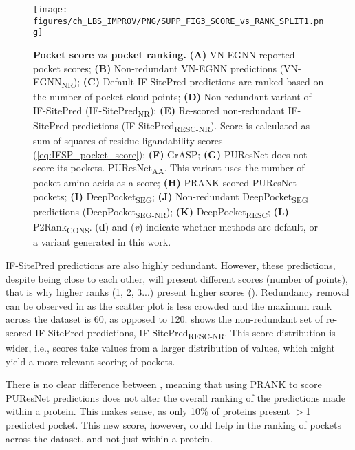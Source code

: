 \begin{figure}[htb!]
    \centering
    \texttt{[image: figures/ch\_LBS\_IMPROV/PNG/SUPP\_FIG3\_SCORE\_vs\_RANK\_SPLIT1.png]}
    \caption[Pocket score \textit{vs} pocket ranking]{\textbf{Pocket score \textit{vs} pocket ranking.} \textbf{(A)} VN-EGNN reported pocket scores; \textbf{(B)} Non-redundant VN-EGNN predictions (VN-EGNN\textsubscript{NR}); \textbf{(C)} Default IF-SitePred predictions are ranked based on the number of pocket cloud points; \textbf{(D)} Non-redundant variant of IF-SitePred (IF-SitePred\textsubscript{NR}); \textbf{(E)} Re-scored non-redundant IF-SitePred predictions (IF-SitePred\textsubscript{RESC-NR}). Score is calculated as sum of squares of residue ligandability scores (\autoref{eq:IFSP_pocket_score}); \textbf{(F)} GrASP; \textbf{(G)} PUResNet does not score its pockets. PUResNet\textsubscript{AA}. This variant uses the number of pocket amino acids as a score; \textbf{(H)} PRANK scored PUResNet pockets; \textbf{(I)} DeepPocket\textsubscript{SEG}; \textbf{(J)} Non-redundant DeepPocket\textsubscript{SEG} predictions (DeepPocket\textsubscript{SEG-NR}); \textbf{(K)} DeepPocket\textsubscript{RESC}; \textbf{(L)} P2Rank\textsubscript{CONS}. (\textbf{d}) and (\textit{v}) indicate whether methods are default, or a variant generated in this work.}
    \label{fig:pocket_score_vs_rank1}
\end{figure}

IF-SitePred predictions are also highly redundant. However, these predictions, despite being close to each other, will present different scores (number of points), that is why higher ranks (1, 2, 3...) present higher scores (). Redundancy removal can be observed in  as the scatter plot is less crowded and the maximum rank across the dataset is 60, as opposed to 120.  shows the non-redundant set of re-scored IF-SitePred predictions, IF-SitePred\textsubscript{RESC-NR}. This score distribution is wider, i.e., scores take values from a larger distribution of values, which might yield a more relevant scoring of pockets.

There is no clear difference between , meaning that using PRANK to score PUResNet predictions does not alter the overall ranking of the predictions made within a protein. This makes sense, as only 10\% of proteins present $>$1 predicted pocket. This new score, however, could help in the ranking of pockets across the dataset, and not just within a protein.

